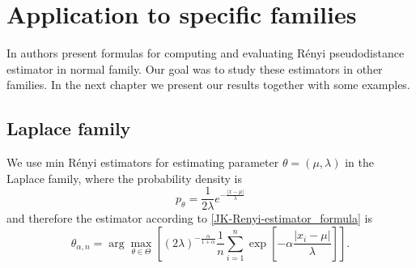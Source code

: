 {\section{Application to specific families}

In \cite{Vajda2009} authors present formulas for computing and evaluating R\'{e}nyi pseudodistance estimator in normal family. Our goal was to study these estimators in other families. In the next chapter we present our results together with some examples.


\subsection*{Laplace family}
We use min R\'{e}nyi estimators for estimating parameter $\theta = (\mu,\lambda)$ in the Laplace family, where the probability density is 
\begin{equation}
	p_\theta = \frac{1}{2\lambda} e^{-\frac{|x-\mu|}{\lambda}}
\end{equation}
and therefore the estimator according to \eqref{JK-Renyi-estimator_formula} is 
\begin{equation}
	\theta_{\alpha,n} = \arg \max_{\theta \in \Theta} \left[ (2\lambda)^{-\frac{\alpha}{1+\alpha}} \frac{1}{n} \sum_{i=1}^n \exp \left[-\alpha\frac{|x_i-\mu|}{\lambda} \right] \right].
\end{equation}

}
